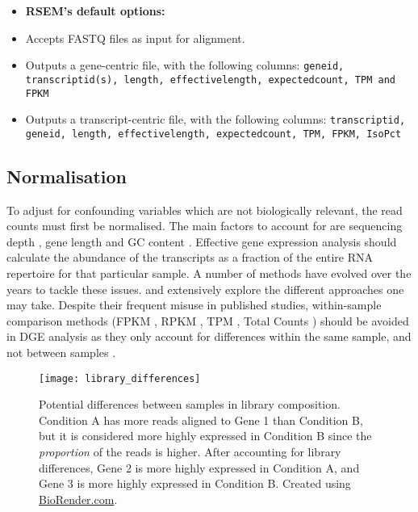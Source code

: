 \begin{itemize}\itemsep0em
\item[] \textbf{RSEM's default options:}
\item Accepts FASTQ files as input for alignment.
\item Outputs a gene-centric file, with the following columns: \texttt{gene\textunderscore id, transcript\textunderscore id(s), length, effective\textunderscore length, expected\textunderscore count, TPM and FPKM}
\item Outputs a transcript-centric file, with the following columns: \texttt{transcript\textunderscore id, gene\textunderscore id, length, effective\textunderscore length, expected\textunderscore count, TPM, FPKM, IsoPct}
\end{itemize}

\subsection{Normalisation}

To adjust for confounding variables which are not biologically relevant, the read counts must first be normalised. The main factors to account for are sequencing depth \citep{robinson2010scaling}, gene length \citep{oshlack2009transcript} and GC content \citep{risso2011gc}. Effective gene expression analysis should calculate the abundance of the transcripts as a fraction of the entire RNA repertoire for that particular sample. A number of methods have evolved over the years to tackle these issues. \cite{dillies2013comprehensive} and \cite{bullard2010evaluation} extensively explore the different approaches one may take. Despite their frequent misuse in published studies, within-sample comparison methods (FPKM \citep{trapnell2010transcript}, RPKM \citep{mortazavi2008mapping}, TPM \citep{li2011rsem}, Total Counts \citep{dillies2013comprehensive}) should be avoided in \ac{DGE} analysis as they only account for differences within the same sample, and not between samples \citep{dundar2015introduction, zhao2020misuse}.

\begin{figure}[!ht]
    \centering
    \texttt{[image: library\_differences]}
    \caption[Differences in library composition between samples]{Potential differences between samples in library composition. Condition A has more reads aligned to Gene 1 than Condition B, but it is considered more highly expressed in Condition B since the \textit{proportion} of the reads is higher. After accounting for library differences, Gene 2 is more highly expressed in Condition A, and Gene 3 is more highly expressed in Condition B. Created using \href{https://biorender.com/}{BioRender.com}. } 
    \label{fig:lib_diff}
\end{figure}

